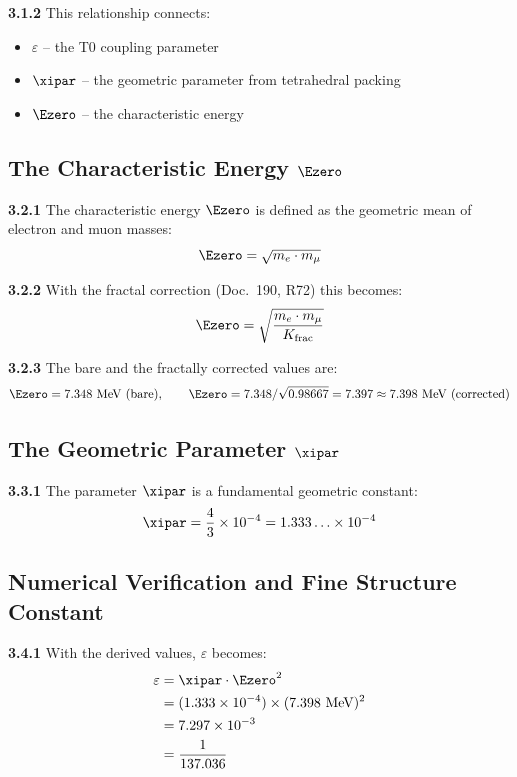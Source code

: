 	\noindent \textbf{3.1.2} This relationship connects:
	\begin{itemize}
		\item $\varepsilon$ -- the T0 coupling parameter
		\item $\xipar$ -- the geometric parameter from tetrahedral packing
		\item $\Ezero$ -- the characteristic energy
	\end{itemize}
	
	\subsection{The Characteristic Energy $\Ezero$}
	
	\noindent \textbf{3.2.1} The characteristic energy $\Ezero$ is defined as the geometric mean of electron and muon masses:
	\begin{equation}
		\Ezero = \sqrt{m_e \cdot m_\mu}
		\label{eq:E0_geometric_mean}
	\end{equation}
	
	\noindent \textbf{3.2.2} With the fractal correction (Doc.~190, R72) this becomes:
	\begin{equation}
		\Ezero = \sqrt{\frac{m_e \cdot m_\mu}{K_{\text{frac}}}}
	\end{equation}
	
	\noindent \textbf{3.2.3} The bare and the fractally corrected values are:
	\begin{equation}
		\Ezero = 7.348 \text{ MeV (bare)}, \qquad \Ezero = 7.348/\sqrt{0.98667} = 7.397 \approx 7.398 \text{ MeV (corrected)}
	\end{equation}
	
	\subsection{The Geometric Parameter $\xipar$}
	
	\noindent \textbf{3.3.1} The parameter $\xipar$ is a fundamental geometric constant:
	\begin{equation}
		\xipar = \frac{4}{3} \times 10^{-4} = 1.333\ldots \times 10^{-4}
		\label{eq:xi_value}
	\end{equation}
	
	\subsection{Numerical Verification and Fine Structure Constant}
	
	\noindent \textbf{3.4.1} With the derived values, $\varepsilon$ becomes:
	\begin{align}
		\varepsilon &= \xipar \cdot \Ezero^2 \\
		&= (1.333 \times 10^{-4}) \times (7.398 \text{ MeV})^2 \\
		&= 7.297 \times 10^{-3} \\
		&= \frac{1}{137.036}
		\label{eq:epsilon_numerical}
	\end{align}
	
